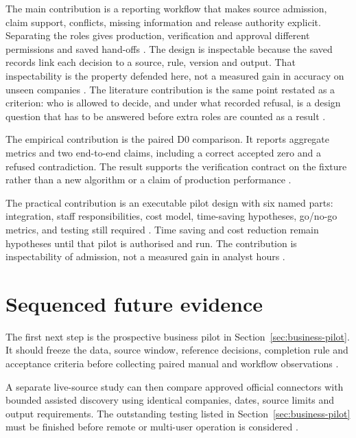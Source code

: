 The main contribution is a reporting workflow that makes source admission, claim support, conflicts,
missing information and release authority explicit. Separating the roles gives production,
verification and approval different permissions and saved hand-offs
\citep{buneman2001provenance,pineau2021reproducibility}. The design is inspectable because the saved
records link each decision to a source, rule, version and output. That inspectability is the property
defended here, not a measured gain in accuracy on unseen companies
\citep{gao2023alce,hevner2004design}. The literature contribution is the same point restated as a
criterion: who is allowed to decide, and under what recorded refusal, is a design question that
has to be answered before extra roles are counted as a result
\citep{fu2026agents,peffers2007dsrm}.

The empirical contribution is the paired D0 comparison. It reports aggregate metrics and two
end-to-end claims, including a correct accepted zero and a refused contradiction. The result supports
the verification contract on the fixture rather than a new algorithm or a claim of production
performance \citep{gao2023alce,gao2023rarr}.

The practical contribution is an executable pilot design with six named parts: integration, staff
responsibilities, cost model, time-saving hypotheses, go/no-go metrics, and testing still required
\citep{peffers2007dsrm,nist2023airmf}. Time saving and cost reduction remain hypotheses until that
pilot is authorised and run. The contribution is inspectability of admission, not a measured gain in
analyst hours \citep{gao2023alce,peffers2007dsrm}.

\section{Sequenced future evidence}

The first next step is the prospective business pilot in Section~\ref{sec:business-pilot}. It should
freeze the data, source window, reference decisions, completion rule and acceptance criteria before
collecting paired manual and workflow observations \citep{kapoor2023leakage,pineau2021reproducibility}.

A separate live-source study can then compare approved official connectors with bounded assisted
discovery using identical companies, dates, source limits and output requirements. The outstanding
testing listed in Section~\ref{sec:business-pilot} must be finished before remote or multi-user
operation is considered \citep{nist2023airmf,cddo2023genai}.

